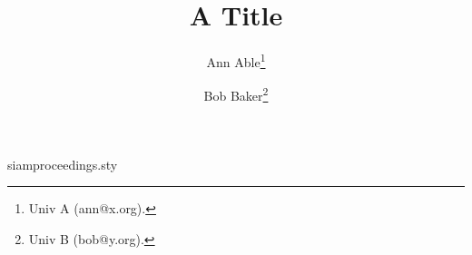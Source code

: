 \begin{filecontents*}[overwrite]{siamproceedings.sty}
\if@titlepage
  \renewcommand\maketitle{\begin{titlepage}%
  \let\footnotesize\small
  \let\footnoterule\relax
  \let \footnote \thanks
  \begin{center}{\LARGE \@title \par}\vskip 3em{\large\begin{tabular}[t]{c}\@author\end{tabular}\par}\end{center}\par
  \@thanks
  \end{titlepage}%
  \setcounter{footnote}{0}%
  \global\let\thanks\relax
  \global\let\maketitle\relax}
\else
\renewcommand\maketitle{\par
  \begingroup
    \renewcommand\thefootnote{\@fnsymbol\c@footnote}%
    \def\@makefnmark{\rlap{\@textsuperscript{\normalfont\@thefnmark}}}%
    \newpage
    \global\@topnum\z@
    \@maketitle
    \thispagestyle{plain}\@thanks
  \endgroup
  \setcounter{footnote}{0}%
  \global\let\thanks\relax
  \global\let\maketitle\relax
  \global\let\@maketitle\relax}
\fi
\end{filecontents*}
\documentclass[titlepage]{article}
\usepackage{siamproceedings}
\title{A Title}
\author{Ann Able\thanks{Univ A (ann@x.org).} \and Bob Baker\thanks{Univ B (bob@y.org).}}

\maketitle
Body.


